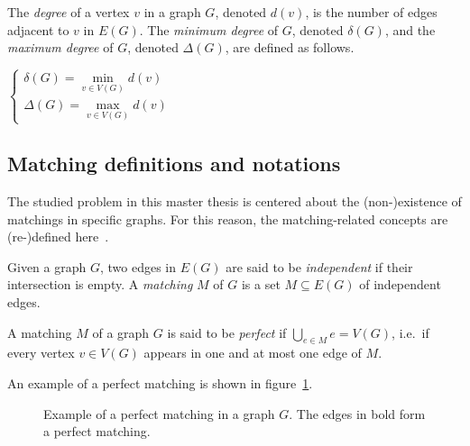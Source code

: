 \begin{definition}
    \label{def:degree}
    The \textit{degree} of a vertex $v$ in a graph $G$, denoted $d(v)$, is the number of edges adjacent to $v$ in $E(G)$.
    The \textit{minimum degree} of $G$, denoted $\delta(G)$, and the \textit{maximum degree} of $G$, denoted $\Delta(G)$, are defined as follows.
    \begin{center}
        $\left\{
        \begin{array}{l}
            \delta(G) = \min\limits_{v \in V(G)} d(v)\\
            \Delta(G) = \max\limits_{v \in V(G)} d(v)
        \end{array}
        \right.$
    \end{center}
\end{definition}


\subsection{Matching definitions and notations}
\label{subsec:matching-definitions-and-notations}

The studied problem in this master thesis is centered about the (non-)existence of matchings in specific graphs.
For this reason, the matching-related concepts are (re-)defined here~\cite{graphtheory}.

\begin{definition}[Matching]
    \label{def:matching}
    Given a graph $G$, two edges in $E(G)$ are said to be \textit{independent} if their intersection is empty.
    A \textit{matching} $M$ of $G$ is a set $M \subseteq E(G)$ of independent edges.
\end{definition}

\begin{definition}
    \label{def:perfect_matching}
    A matching $M$ of a graph $G$ is said to be \textit{perfect} if $\bigcup\limits_{e \in M} e = V(G)$, i.e.\ if every vertex $v \in V(G)$ appears in one and at most one edge of $M$.
\end{definition}

An example of a perfect matching is shown in figure~\ref{fig:perfect_matching}.
\begin{figure}[H]
    \caption{Example of a perfect matching in a graph $G$. The edges in bold form a perfect matching.}
    \label{fig:perfect_matching}
\end{figure}

